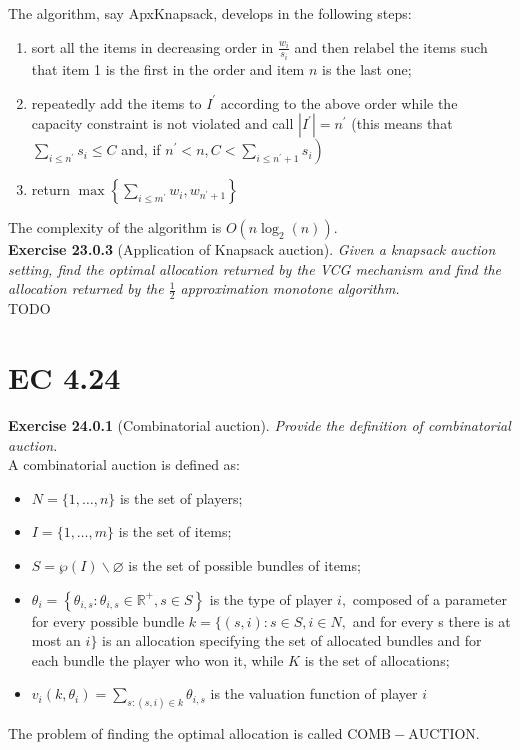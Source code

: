 The algorithm, say ApxKnapsack, develops in the following steps:
\begin{enumerate}
\item sort all the items in decreasing order in $\frac{w_{i}}{s_{i}}$ and then relabel the items such that item 1 is the first in the order and item $n$ is the last one;
\item repeatedly add the items to $I^{\prime}$ according to the above order while the capacity constraint is not violated and call $\left|I^{\prime}\right|=n^{\prime}$ (this means that $\sum_{i \leqslant n^{\prime}} s_{i} \leqslant C$ and, if $\left.n^{\prime}<n, C<\sum_{i \leqslant n^{\prime}+1} s_{i}\right)$
\item return $\max \left\{\sum_{i \leqslant m^{\prime}} w_{i}, w_{n^{\prime}+1}\right\}$
\end{enumerate}
The complexity of the algorithm is $O\left(n \log _{2}(n)\right)$.\\

\textbf{Exercise 23.0.3} (Application of Knapsack auction). \textit{Given a knapsack auction setting, find the optimal allocation returned by the VCG mechanism and find the allocation returned by the $\frac{1}{2}$ approximation monotone algorithm.}\\

TODO\\

\section{EC 4.24}

\textbf{Exercise 24.0.1} (Combinatorial auction). \textit{Provide the definition of combinatorial auction.}\\

A combinatorial auction is defined as:
\begin{itemize}
\item $N=\{1, \ldots, n\}$ is the set of players;
\item $I=\{1, \ldots, m\}$ is the set of items;
\item $ S=\wp(I) \backslash \varnothing$ is the set of possible bundles of items;
\item $\theta_{i}=\left\{\theta_{i, s}: \theta_{i, s} \in \mathbb{R}^{+}, s \in S\right\}$ is the type of player $i,$ composed of a parameter for every possible bundle
$k=\{(s, i): s \in S, i \in N,$ and for every s there is at most an $i\}$ is an allocation specifying the set of allocated bundles and for each bundle the player who won it, while $K$ is the set of allocations;
\item $v_{i}\left(k, \theta_{i}\right)=\sum_{s:(s, i) \in k} \theta_{i, s}$ is the valuation function of player $i$
\end{itemize}
The problem of finding the optimal allocation is called $\mathrm{COMB}-\mathrm{AUCTION}$.\\


